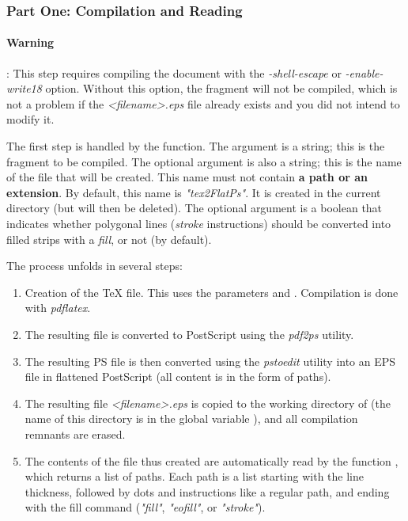 \subsubsection{Part One: Compilation and Reading}

\paragraph{Warning}: This step requires compiling the document with the \emph{-shell-escape} or \emph{-enable-write18} option.
Without this option, the fragment will not be compiled, which is not a problem if the \emph{<filename>.eps} file already exists and you did not intend to modify it.

The first step is handled by the  function. The  argument is a string; this is the fragment to be compiled. The optional  argument is also a string; this is the name of the file that will be created. This name must not contain \textbf{a path or an extension}. By default, this name is \emph{"tex2FlatPs"}. It is created in the current directory (but will then be deleted). The optional argument  is a boolean that indicates whether polygonal lines (\emph{stroke} instructions) should be converted into filled strips with a \emph{fill}, or not (\false by default).

The process unfolds in several steps:

\begin{enumerate}
    \item Creation of the TeX file. This uses the parameters  and . Compilation is done with \emph{pdflatex}.

    \item The resulting file is converted to PostScript using the \emph{pdf2ps} utility.

    \item The resulting PS file is then converted using the \emph{pstoedit} utility into an EPS file in flattened PostScript (all content is in the form of paths).

    \item The resulting file \emph{<filename>.eps} is copied to the working directory of \luadrawenv (the name of this directory is in the global variable ), and all compilation remnants are erased.

    \item The contents of the file thus created are automatically read by the function , which returns a list of paths. Each path is a list starting with the line thickness, followed by dots and instructions like a regular path, and ending with the fill command (\emph{"fill"}, \emph{"eofill"}, or \emph{"stroke"}).
\end{enumerate}


